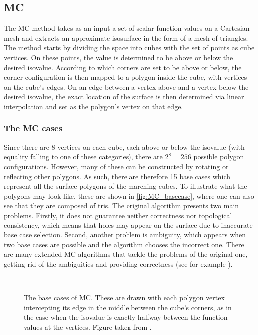 \subsection{\Acl{MC}} 
The \acf{MC} method \cite{Marching2006} takes as an input a set of scalar function values on a Cartesian mesh and extracts an approximate isosurface in the form of a mesh of triangles. The method starts by dividing the space into cubes with the set of points as cube vertices. On these points, the value is determined to be above or below the desired isovalue. According to which corners are set to be above or below, the corner configuration is then mapped to a polygon inside the cube, with vertices on the cube's edges. On an edge between a vertex above and a vertex below the desired isovalue, the exact location of the surface is then determined via linear interpolation and set as the polygon's vertex on that edge.

\subsubsection{The \acl{MC} cases}
Since there are 8 vertices on each cube, each above or below the isovalue (with equality falling to one of these categories), there are $2^8=256$ possible polygon configurations. However, many of these can be constructed by rotating or reflecting other polygons. As such, there are therefore 15 base cases which represent all the surface polygons of the marching cubes. To illustrate what the polygons may look like, these are shown in \autoref{fig:MC_basecase}, where one can also see that they are composed of \acp{tri}. 
The original algorithm presents two main problems. Firstly, it does not guarantee neither correctness nor topological consistency, which means that holes may appear on the surface due to inaccurate base case selection. Second, another problem is ambiguity, which appears when two base cases are possible and the algorithm chooses the incorrect one. There are many extended \ac{MC} algorithms that tackle the problems of the original one, getting rid of the ambiguities and providing correctness (see for example \cite{ExtendedMC}).
\begin{figure}[b]
\centering
   \\
   \caption{The base cases of \ac{MC}. These are drawn with each polygon vertex intercepting its edge in the middle between the cube's corners, as in the case when the isovalue is exactly halfway between the function values at the vertices. Figure taken from \cite{Marching2006}.}
   \label{fig:MC_basecase}
\end{figure}

